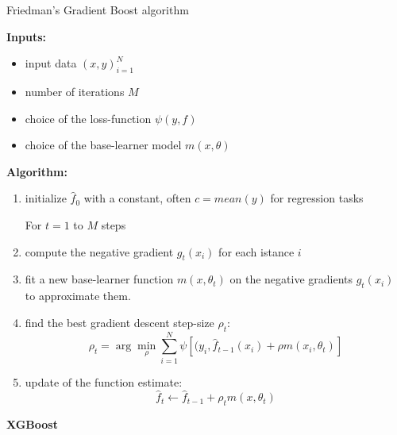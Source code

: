 \begin{tcolorbox}[colback=blue!5, colframe=blue!80, boxrule=0pt]
    \begin{algorithm} [H]
        \caption{Friedman’s Gradient Boost algorithm}
        \label{alg:gradient boosting}
        \textbf{Inputs:}
        \begin{itemize}
            \item input data $(x, y)_{i=1}^{N}$
            \item number of iterations $M$
            \item choice of the loss-function $\psi(y, f)$
            \item choice of the base-learner model $m(x, \theta)$
        \end{itemize}

        \textbf{Algorithm:}
        \begin{enumerate}
            \item initialize $\hat{f}_0$ with a constant, often  $c=mean(y)$ for regression tasks
            
        For $t=1$ to $M$ steps
            
            \item compute the negative gradient $g_t(x_i)$ for each istance $i$
            \item fit a new base-learner function $m(x, \theta_t)$ on the negative gradients $g_t(x_i)$ to approximate them.
            \item find the best gradient descent step-size $\rho_t$:
            \[
            \rho_t = \arg \min_{\rho} \sum_{i=1}^{N} \psi[( y_i, \hat{f}_{t-1}(x_i) +\rho m(x_i, \theta_t) ]
            \]
            \item update of the function estimate:
            \[
            \hat{f}_t \leftarrow \hat{f}_{t-1} + \rho_t m(x, \theta_t)
            \]
        \end{enumerate}
    \end{algorithm}
\end{tcolorbox}



\textbf{XGBoost} 

